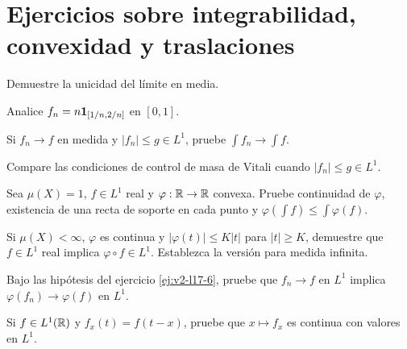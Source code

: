 \section{Ejercicios sobre integrabilidad, convexidad y traslaciones}
\begin{ejercicio}\label{ej:v2-l17-1}
Demuestre la unicidad del límite en media.
\end{ejercicio}

\begin{ejercicio}\label{ej:v2-l17-2}
Analice $f_n=n\mathbf1_{[1/n,2/n]}$ en $[0,1]$.
\end{ejercicio}

\begin{ejercicio}\label{ej:v2-l17-3}
Si $f_n\to f$ en medida y $|f_n|\le g\in L^1$, pruebe $\int f_n\to\int f$.
\end{ejercicio}

\begin{ejercicio}\label{ej:v2-l17-4}
Compare las condiciones de control de masa de Vitali cuando $|f_n|\le g\in L^1$.
\end{ejercicio}

\begin{ejercicio}\label{ej:v2-l17-5}
Sea $\mu(X)=1$, $f\in L^1$ real y $\varphi:\mathbb R\to\mathbb R$ convexa. Pruebe continuidad de $\varphi$, existencia de una recta de soporte en cada punto y $\varphi(\int f)\le\int\varphi(f)$.
\end{ejercicio}

\begin{ejercicio}\label{ej:v2-l17-6}
Si $\mu(X)<\infty$, $\varphi$ es continua y $|\varphi(t)|\le K|t|$ para $|t|\ge K$, demuestre que $f\in L^1$ real implica $\varphi\circ f\in L^1$. Establezca la versión para medida infinita.
\end{ejercicio}

\begin{ejercicio}\label{ej:v2-l17-7}
Bajo las hipótesis del ejercicio \ref{ej:v2-l17-6}, pruebe que $f_n\to f$ en $L^1$ implica $\varphi(f_n)\to\varphi(f)$ en $L^1$.
\end{ejercicio}

\begin{ejercicio}\label{ej:v2-l17-8}
Si $f\in L^1(\mathbb R)$ y $f_x(t)=f(t-x)$, pruebe que $x\mapsto f_x$ es continua con valores en $L^1$.
\end{ejercicio}
